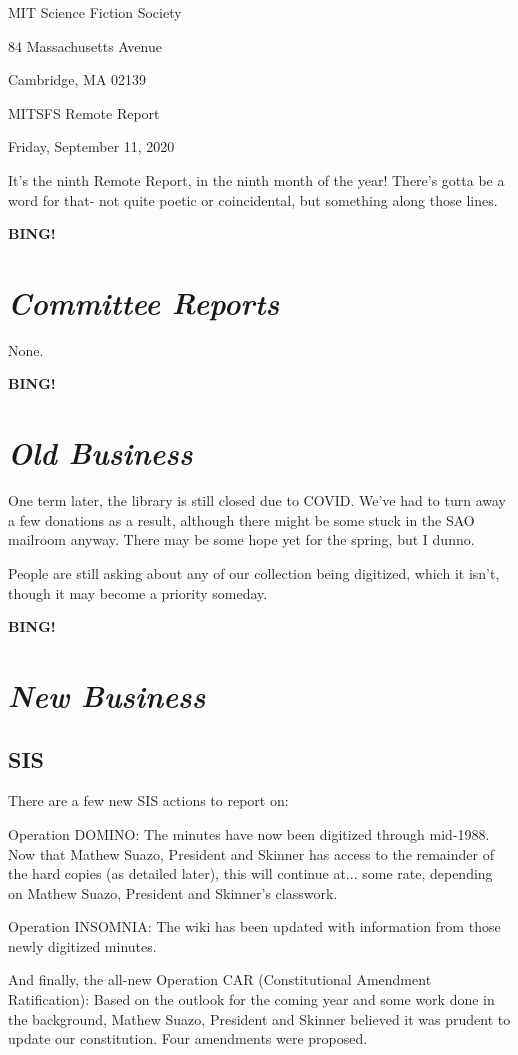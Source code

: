 \documentclass[10pt]{article}
\newcommand{\bing}{{\bf BING!} }
\newcommand{\goto}[1]{\bing \vskip 12pt \section*{{\em{#1}}}}
\newcommand{\skinner}{Mathew Suazo, President and Skinner\xspace}
\newcommand{\meetingdate}{Friday, September 11, 2020}
\begin{document}
\begin{center}

MIT Science Fiction Society

84 Massachusetts Avenue

Cambridge, MA 02139

\vspace{12pt}

MITSFS Remote Report

\meetingdate

\end{center}

\vspace{18pt}

\setlength{\parskip}{6pt}

\noindent
It's the ninth Remote Report, in the ninth month of the year! There's gotta be a word for that- not quite poetic or coincidental, but something along those lines.

\goto{Committee Reports}

None.

\goto{Old Business}

One term later, the library is still closed due to COVID. We've had to turn away a few donations as a result, although there might be some stuck in the SAO mailroom anyway. There may be some hope yet for the spring, but I dunno.

People are still asking about any of our collection being digitized, which it isn't, though it may become a priority someday.

\goto{New Business}

\subsection*{SIS}

There are a few new SIS actions to report on:

Operation DOMINO: The minutes have now been digitized through mid-1988. Now that \skinner has access to the remainder of the hard copies (as detailed later), this will continue at... some rate, depending on \skinner's classwork.

Operation INSOMNIA: The wiki has been updated with information from those newly digitized minutes.

And finally, the all-new Operation CAR (Constitutional Amendment Ratification): Based on the outlook for the coming year and some work done in the background, \skinner believed it was prudent to update our constitution. Four amendments were proposed.
\end{document}
